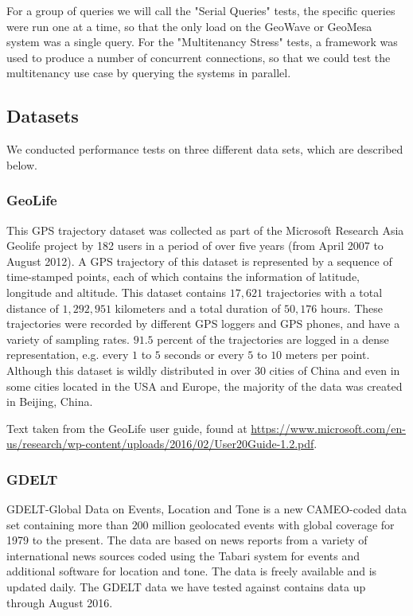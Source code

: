For a group of queries we will call the "Serial Queries" tests, the specific queries were run one at a time, so that the only load on the GeoWave or GeoMesa system was a single query.
For the "Multitenancy Stress" tests, a framework was used to produce a number of concurrent connections, so that we could test the multitenancy use case by querying the systems in parallel.


\subsection{Datasets}
\label{sec:performance:datasets}

We conducted performance tests on three different data sets, which are described below.

\subsubsection{GeoLife}
\label{sec:performance:datasets:geolife}

This GPS trajectory dataset was collected as part of the Microsoft Research Asia Geolife project by 182 users in a period of over five years (from April 2007 to August 2012).
A GPS trajectory of this dataset is represented by a sequence of time-stamped points, each of which contains the information of latitude, longitude and altitude.
This dataset contains $17,621$ trajectories with a total distance of $1,292,951$ kilometers and a total duration of $50,176$ hours.
These trajectories were recorded by different GPS loggers and GPS phones, and have a variety of sampling rates.
$91.5$ percent of the trajectories are logged in a dense representation, e.g. every $1$ to $5$ seconds or every $5$ to $10$ meters per point.
Although this dataset is wildly distributed in over 30 cities of China and even in some cities located in the USA and Europe, the majority of the data was created in Beijing, China.

Text taken from the GeoLife user guide, found at \url{https://www.microsoft.com/en-us/research/wp-content/uploads/2016/02/User20Guide-1.2.pdf}.


\subsubsection{GDELT}
\label{sec:performance:datasets:gdelt}

GDELT-Global Data on Events, Location and Tone is a new CAMEO-coded data set containing more than $200$ million geolocated events with global coverage for 1979 to the present.
The data are based on news reports from a variety of international news sources coded using the Tabari system for events and additional software for location and tone.
The data is freely available and is updated daily.
The GDELT data we have tested against contains data up through August 2016.

